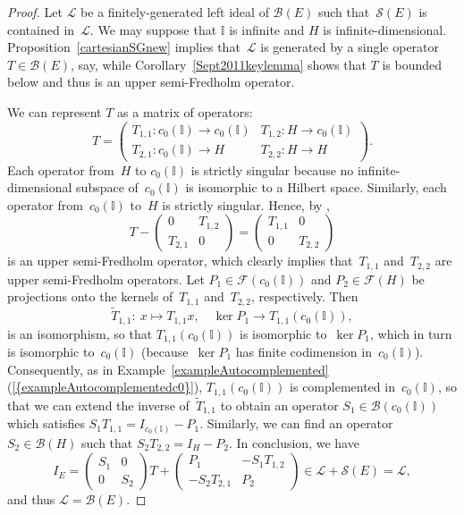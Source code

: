 \documentclass[12pt]{amsart}
\theoremstyle{definition}
\numberwithin{equation}{section}
\begin{document}
\begin{proof} Let $\mathscr{L}$ be a finitely-generated left ideal of
  $\mathscr{B}(E)$ such that~$\mathscr{S}(E)$ is contained
  in~$\mathscr{L}$. We may suppose that $\mathbb{I}$ is infinite and
  $H$ is infinite-dimensional.  Proposition~\ref{cartesianSGnew}
  implies that~$\mathscr{L}$ is generated by a single operator
  \mbox{$T\in\mathscr{B}(E)$}, say, while
  Corollary~\ref{Sept2011keylemma} shows that $T$ is bounded below and
  thus is an upper semi-Fredholm operator.

  We can represent $T$ as a matrix of operators:
  \[ T = \begin{pmatrix} T_{1,1}\colon c_0(\mathbb{I})\to
    c_0(\mathbb{I}) & T_{1,2}\colon H\to c_0(\mathbb{I})\\
    T_{2,1}\colon c_0(\mathbb{I})\to H & T_{2,2}\colon H\to
    H \end{pmatrix}. \] Each operator from~$H$ to $c_0(\mathbb{I})$ is
  strictly singular because no infinite-dimen\-sional subspace
  of~$c_0(\mathbb{I})$ is isomorphic to a Hilbert space. Similarly,
  each operator from~$c_0(\mathbb{I})$ to~$H$ is strictly
  singular. Hence, by \cite[Proposition~2.c.10]{lt1},
  \[ T - \begin{pmatrix} 0 & T_{1,2}\\ T_{2,1} & 0 \end{pmatrix}
  = \begin{pmatrix} T_{1,1} & 0\\ 0& T_{2,2} \end{pmatrix} \] is an
  upper semi-Fredholm operator, which clearly implies that~$T_{1,1}$
  and~$T_{2,2}$ are upper semi-Fredholm operators. Let
  $P_1\in\mathscr{F}(c_0(\mathbb{I}))$ and
  \mbox{$P_2\in\mathscr{F}(H)$} be projections onto the kernels
  of~$T_{1,1}$ and~$T_{2,2}$,
  respectively. Then \[\widetilde{T}_{1,1}\colon\ x\mapsto
  T_{1,1}x,\quad \ker P_1\to T_{1,1}(c_0(\mathbb{I})), \] is an
  isomorphism, so that $T_{1,1}(c_0(\mathbb{I}))$ is isomorphic
  to~$\ker P_1$, which in turn is isomorphic to~$c_0(\mathbb{I})$
  (because~$\ker P_1$ has finite codimension
  in~$c_0(\mathbb{I})$). Consequently, as in
  Example~\ref{exampleAutocomplemented}  {{\normalfont\textrm{(\ref{{exampleAutocomplementedc0}})}}}, $T_{1,1}(c_0(\mathbb{I}))$ is
  complemented in~$c_0(\mathbb{I})$, so that we can extend the inverse
  of~$\widetilde{T}_{1,1}$ to obtain an operator
  $S_1\in\mathscr{B}(c_0(\mathbb{I}))$ which satisfies $S_1T_{1,1} =
  I_{c_0(\mathbb{I})} - P_1$. Similarly, we can find an operator
  $S_2\in\mathscr{B}(H)$ such that $S_2T_{2,2} = I_H - P_2$. In
  conclusion, we have
  \[ I_E = 
  \begin{pmatrix} S_1 & 0\\ 0 & S_2 \end{pmatrix} T +
  \begin{pmatrix} P_1 & -S_1T_{1,2}\\ -S_2T_{2,1} &
    P_2 \end{pmatrix}\in\mathscr{L} + \mathscr{S}(E) = \mathscr{L}, \]
  and thus $\mathscr{L} = \mathscr{B}(E)$.  


\end{proof}
\end{document}
